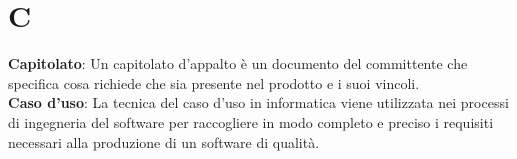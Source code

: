 \section{C}
\textbf{Capitolato}: Un capitolato d’appalto è un documento del committente che specifica cosa richiede che
sia presente nel prodotto e i suoi vincoli.\\
\textbf{Caso d'uso}: La tecnica del caso d'uso in informatica viene utilizzata nei processi di ingegneria del software per raccogliere in modo completo e preciso i requisiti necessari alla produzione di un software di qualità.\\

